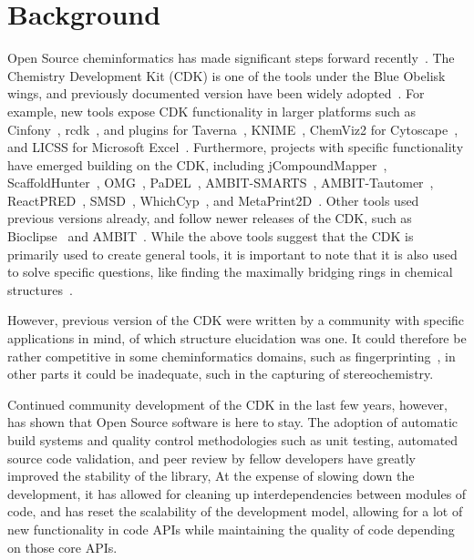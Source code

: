 \documentclass[10pt]{bmcart}
\begin{document}
\section*{Background}

Open Source cheminformatics has made significant steps forward recently~\cite{OBoyle2011}.
The Chemistry Development Kit (CDK) is one of the tools under the Blue Obelisk wings,
and previously documented version have been widely adopted~\cite{Steinbeck2003,Steinbeck2006}.
For example, new tools expose CDK functionality in larger platforms such as Cinfony~\cite{OBoyle2008},
rcdk~\cite{Guha2007}, and plugins for Taverna~\cite{Truszkowski2011},
KNIME~\cite{Beisken2013}, ChemViz2 for Cytoscape~\cite{ChemViz2}, and LICSS for
Microsoft Excel~\cite{Lawson2012}.
Furthermore, projects with specific functionality have emerged building on the CDK, including
jCompoundMapper~\cite{Hinselmann2011}, ScaffoldHunter~\cite{wetzel2009interactive}, OMG~\cite{Peironcely2012},
PaDEL~\cite{yap2011padel}, AMBIT-SMARTS~\cite{jeliazkova2011ambitsmarts}, AMBIT-Tautomer~\cite{kochev2013ambit},
ReactPRED~\cite{ReactPRED}, SMSD~\cite{Rahman2009,Rahman2014,Rahman2016}, WhichCyp~\cite{Rostkowski2013},
and MetaPrint2D~\cite{Carlsson2010}. Other tools used previous versions already, and follow
newer releases of the CDK, such as Bioclipse~\cite{spjuth2007bioclipse,
spjuth2009bioclipse} and AMBIT~\cite{jeliazkova2011ambit}. While the above
tools suggest that the CDK is primarily used to create general tools, it is
important to note that it is also used to solve specific questions, like finding
the maximally bridging rings in chemical structures~\cite{Marth2015}.

However, previous version of the CDK were written by a community with specific applications
in mind, of which structure elucidation was one. It could therefore be rather competitive
in some cheminformatics domains, such as fingerprinting~\cite{Clark2014,Cannon2006}, in other parts
it could be inadequate, such in the capturing of stereochemistry.

Continued community development of the CDK in the last few years, however, has shown that
Open Source software is here to stay. The adoption of automatic build systems and
quality control methodologies such as unit testing, automated source code validation,
and peer review by fellow developers have greatly improved the stability of the library,
At the expense of slowing down the development, it has allowed for cleaning up interdependencies
between modules of code, and has reset the scalability of the development model,
allowing for a lot of new functionality in code APIs while maintaining the quality
of code depending on those core APIs.
\end{document}
